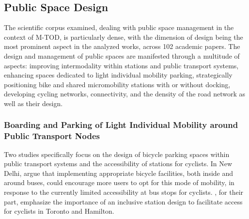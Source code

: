 \begin{refsegment}
\subsection{Public Space Design
    \label{chap2:traitement-espaces-publics}
    }

The scientific corpus examined, dealing with public space management in the context of \acrshort{M-TOD}, is particularly dense, with the dimension of \gls{design} being the most prominent aspect in the analyzed works, across 102 academic papers. The design and management of public spaces are manifested through a multitude of aspects: improving intermodality within stations and public transport systems, enhancing spaces dedicated to light individual mobility parking, strategically positioning bike and shared micromobility stations with or without docking, developing cycling networks, connectivity, and the density of the road network as well as their design.%

\subsubsection*{Boarding and Parking of Light Individual Mobility around Public Transport Nodes
    \label{chap2:embarquement-stationnement}
    }

Two studies specifically focus on the design of bicycle parking spaces within public transport systems and the accessibility of stations for cyclists. In New Delhi, \textcolor{blue}{\textcite[8]{advani_bicycle_2006}} argue that implementing appropriate bicycle facilities, both inside and around buses, could encourage more users to opt for this mode of mobility, in response to the currently limited accessibility at bus stops for cyclists. \textcolor{blue}{\textcite[382]{ravensbergen_biking_2018}}, for their part, emphasize the importance of an inclusive station design to facilitate access for cyclists in Toronto and Hamilton.%


\end{refsegment}
